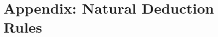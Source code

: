 \documentclass[letterpaper,10pt,english]{sphinxmanual}
\begin{document}
\chapter{Appendix: Natural Deduction Rules}
\label{\detokenize{nd_quickref:appendix-natural-deduction-rules}}\label{\detokenize{nd_quickref::doc}}
\sphinxAtStartPar
{}



\begin{quote}
\AXM{}
\noLine
\UIM{\vdots}
\noLine
{}
\DP
\quad\quad
{}
\DP
\end{quote}

\sphinxAtStartPar
{}



\begin{quote}
\DP
\quad\quad
{}
\DP
\quad\quad
{}
\DP
\end{quote}

\sphinxAtStartPar
{}



\begin{quote}
\AXM{}
\noLine
\UIM{\vdots}
\noLine
\UIM{\bot}
\DP
\quad\quad
{}
\BIM{\bot}
\DP
\end{quote}

\sphinxAtStartPar
{}



\begin{quote}
\DP
\quad\quad
{}
\DP
\quad\quad
{}
\AXM{}
\noLine
\UIM{\vdots}
\noLine
{}
\AXM{}
\noLine
\UIM{\vdots}
\noLine
{}
\DP
\end{quote}

\sphinxAtStartPar
{}



\begin{quote}
\AXM{\bot}
\DP
\quad\quad
\AXM{}
\UIM{\top}
\DP
\end{quote}
\end{document}
